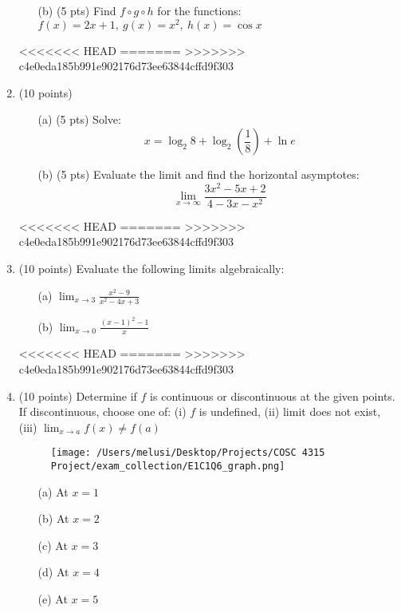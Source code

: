 \begin{enumerate}
\begin{enumerate}
        \item [(b)] (5 pts) Find \( f \circ g \circ h \) for the functions: \\
        \( f(x) = 2x + 1,\ g(x) = x^2,\ h(x) = \cos x \)
    \end{enumerate}

<<<<<<< HEAD
=======
>>>>>>> c4e0eda185b991e902176d73ee63844cffd9f303
    \item (10 points)
    \begin{enumerate}
        \item [(a)]  (5 pts) Solve:
        \[
        x = \log_2 8 + \log_2 \left(\frac{1}{8}\right) + \ln e
        \]

        \item [(b)] (5 pts) Evaluate the limit and find the horizontal asymptotes:
        \[
        \lim_{x \to \infty} \frac{3x^2 - 5x + 2}{4 - 3x - x^2}
        \]
    \end{enumerate}

<<<<<<< HEAD
=======
>>>>>>> c4e0eda185b991e902176d73ee63844cffd9f303
    \item (10 points) Evaluate the following limits algebraically:
    \begin{enumerate}
        \item [(a)]  \( \lim_{x \to 3} \frac{x^2 - 9}{x^2 - 4x + 3} \)
        \item [(b)] \( \lim_{x \to 0} \frac{(x - 1)^2 - 1}{x} \)
    \end{enumerate}

<<<<<<< HEAD
=======
>>>>>>> c4e0eda185b991e902176d73ee63844cffd9f303
    \item (10 points) Determine if \( f \) is continuous or discontinuous at the given points. If discontinuous, choose one of: 
    (i) \( f \) is undefined, 
    (ii) limit does not exist, 
    (iii) \( \lim_{x \to a} f(x) \neq f(a) \)

    \begin{figure}[ht!]
        \centering
        \texttt{[image: /Users/melusi/Desktop/Projects/COSC 4315 Project/exam\_collection/E1C1Q6\_graph.png]}
    \end{figure}

    \begin{itemize}
        \item [(a)] At \( x = 1 \)
        \item [(b)] At \( x = 2 \)
        \item [(c)] At \( x = 3 \)
        \item [(d)] At \( x = 4 \)
        \item [(e)] At \( x = 5 \)
    \end{itemize}


\end{enumerate}
